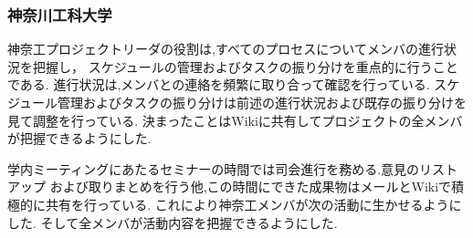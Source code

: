 \subsubsection{神奈川工科大学}
\par 神奈工プロジェクトリーダの役割は,すべてのプロセスについてメンバの進行状況を把握し，
スケジュールの管理およびタスクの振り分けを重点的に行うことである.
進行状況は,メンバとの連絡を頻繁に取り合って確認を行っている.
スケジュール管理およびタスクの振り分けは前述の進行状況および既存の振り分けを見て調整を行っている.
決まったことはWikiに共有してプロジェクトの全メンバが把握できるようにした.
\par 学内ミーティングにあたるセミナーの時間では司会進行を務める.意見のリストアップ
および取りまとめを行う他,この時間にできた成果物はメールとWikiで積極的に共有を行っている.
これにより神奈工メンバが次の活動に生かせるようにした.
そして全メンバが活動内容を把握できるようにした.
